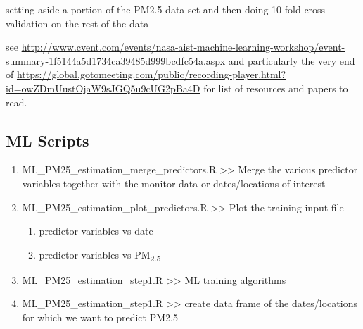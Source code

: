 
setting aside a portion of the PM2.5 data set and then doing 10-fold cross validation on the rest of the data

see \url{http://www.cvent.com/events/nasa-aist-machine-learning-workshop/event-summary-1f5144a5d1734ca39485d999bcdfc54a.aspx} and particularly the very end of \url{https://global.gotomeeting.com/public/recording-player.html?id=owZDmUustOjaW9sJGQ5u9cUG2pBa4D} for list of resources and papers to read.


\subsection{ML Scripts}

\begin{enumerate}

\item ML\_PM25\_estimation\_merge\_predictors.R >>  Merge the various predictor variables together with the monitor data or dates/locations of interest %

\item ML\_PM25\_estimation\_plot\_predictors.R >> Plot the training input file %
	\begin{enumerate}
		\item predictor variables vs date
		\item predictor variables vs PM\textsubscript{2.5}
	\end{enumerate}

\item ML\_PM25\_estimation\_step1.R >> ML training algorithms

\item ML\_PM25\_estimation\_step1.R >> create data frame of the dates/locations for which we want to predict PM2.5

\end{enumerate}